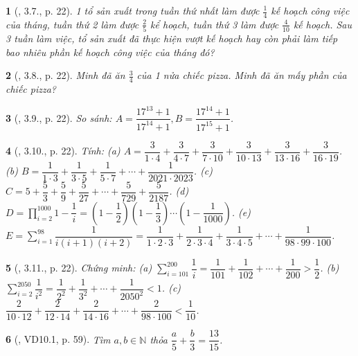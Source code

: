\documentclass{article}
\newtheorem{baitoan}{}
\begin{document}
\begin{baitoan}[\cite{Binh_boi_duong_Toan_6_tap_2}, 3.7., p. 22]
	1 tổ sản xuất trong tuần thứ nhất làm được $\frac{1}{4}$ kế hoạch công việc của tháng, tuần thứ 2 làm được $\frac{2}{5}$ kể hoạch, tuần thứ 3 làm được $\frac{4}{10}$ kế hoạch. Sau 3 tuần làm việc, tổ sản xuất đã thực hiện vượt kế hoạch hay còn phải làm tiếp bao nhiêu phần kế hoạch công việc của tháng đó?
\end{baitoan}

\begin{baitoan}[\cite{Binh_boi_duong_Toan_6_tap_2}, 3.8., p. 22]
	Minh đã ăn $\frac{3}{4}$ của 1 nửa chiếc pizza. Minh đã ăn mấy phần của chiếc pizza?
\end{baitoan}

\begin{baitoan}[\cite{Binh_boi_duong_Toan_6_tap_2}, 3.9., p. 22]
	So sánh: $A = \dfrac{17^{13} + 1}{17^{14} + 1},B = \dfrac{17^{14} + 1}{17^{15} + 1}$.
\end{baitoan}

\begin{baitoan}[\cite{Binh_boi_duong_Toan_6_tap_2}, 3.10., p. 22]
	Tính: (a) $A = \dfrac{3}{1\cdot4} + \dfrac{3}{4\cdot7} + \dfrac{3}{7\cdot10} + \dfrac{3}{10\cdot13} + \dfrac{3}{13\cdot16} + \dfrac{3}{16\cdot19}$. (b) $B = \dfrac{1}{1\cdot3} + \dfrac{1}{3\cdot5} + \dfrac{1}{5\cdot7} + \cdots + \dfrac{1}{2021\cdot2023}$. (c) $C = 5 + \dfrac{5}{3} + \dfrac{5}{9} + \dfrac{5}{27} + \cdots + \dfrac{5}{729} + \dfrac{5}{2187}$. (d) $D = \prod_{i=2}^{1000} 1 - \dfrac{1}{i} = \left(1 - \dfrac{1}{2}\right)\left(1 - \dfrac{1}{3}\right)\cdots\left(1 - \dfrac{1}{1000}\right)$. (e) $E = \sum_{i=1}^{98} \dfrac{1}{i(i + 1)(i + 2)} = \dfrac{1}{1\cdot2\cdot3} + \dfrac{1}{2\cdot3\cdot4} + \dfrac{1}{3\cdot4\cdot5} + \cdots + \dfrac{1}{98\cdot99\cdot100}$.
\end{baitoan}

\begin{baitoan}[\cite{Binh_boi_duong_Toan_6_tap_2}, 3.11., p. 22]
	Chứng minh: (a) $\sum_{i=101}^{200} \dfrac{1}{i} = \dfrac{1}{101} + \dfrac{1}{102} + \cdots + \dfrac{1}{200} > \dfrac{1}{2}$. (b) $\sum_{i=2}^{2050} \dfrac{1}{i^2} = \dfrac{1}{2^2} + \dfrac{1}{3^2} + \cdots + \dfrac{1}{2050^2} < 1$. (c) $\dfrac{2}{10\cdot12} + \dfrac{2}{12\cdot14} + \dfrac{2}{14\cdot16} + \cdots + \dfrac{2}{98\cdot100} < \dfrac{1}{10}$.
\end{baitoan}

\begin{baitoan}[\cite{TLCT_THCS_Toan_6_so_hoc}, VD10.1, p. 59]
	Tìm $a,b\in\mathbb{N}$ thỏa $\dfrac{a}{5} + \dfrac{b}{3} = \dfrac{13}{15}$.
\end{baitoan}
\end{document}
